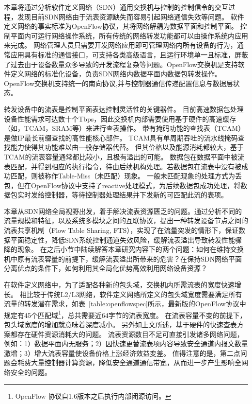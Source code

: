 
\label{chap5}


\label{chap51}

本章将通过分析软件定义网络（SDN）通用交换机与控制的控制信令的交互过程，发现目前SDN网络由于流表资源缺失而容易引起网络通信失效等问题。
软件定义网络的事实标准为OpenFlow协议，其将网络解耦为数据平面和控制平面。
控制平面内可运行网络操作系统，所有传统的网络转发功能都可以由操作系统内应用来完成。
网络管理人员只需要开发网络应用即可管理网络内所有设备的行为，通常应用具有标准的通信接口，可支持各类高级语言，且运行环境单一且标准，屏蔽了过去由于设备数量众多导致的开发流程复杂等问题。OpenFlow交换机是支持软件定义网络的标准化设备，负责SDN网络内数据平面内数据包转发操作。
OpenFlow交换机支持统一的南向协议,并与控制器通信传递配置信息与数据层状态。

转发设备中的流表是控制平面表达控制灵活性的关键器件。
目前高速数据包处理设备性能需求可达数十个Tbps，因此交换机内部需要使用基于硬件的高速缓存（如，TCAM，SRAM等）来进行查表操作。
带有掩码功能的查找表（TCAM）是做IP最长前缀查找的高性能核心部件。
TCAM具有单周期吞吐的流水线掩码查找能力使得其功能难以由一般存储器代替。
但其价格以及能源消耗都较大，基于TCAM的流表容量通常都比较小，且极有溢出的可能。
数据包在数据平面中被流表匹配，并得到相应的执行指令，待由后续机构处理。若数据包在流表中没有被成功匹配，则被称作Table-Miss（未匹配）现象。
一般未匹配现象的处理方式为丢包，但在OpenFlow协议中支持了reactive处理模式，为后续数据包成功处理，将数据包实时发给控制器，等待控制器处理结果并下发新的可匹配此流的表项。

本章从SDN网络全局视野出发，着手解决流表资源匮乏的问题。通过分析不同的流量规模和特征，以及系统多模块之间的互联协议，提出一种转发设备节点之间的流表共享机制（Flow Table Sharing, FTS），实现了在流量突发的情形下，保证数据平面稳定性，降低SDN系统控制通道失效风险，缓解流表溢出导致转发性能骤降的现象。
在之后小节中陆续解答本章研究内容下的两个问题：如何在维持交换机中原有流表容量的前提下，缓解流表溢出所带来的危害？在保持SDN网络平面分离优点的条件下，如何利用其全局化优势高效利用网络设备资源？




在软件定义网络中，为了适配各种新的包头域，交换机内所需流表的宽度快速增长。
相比较于传统L2/L3网络，软件定义网络所定义的包头域宽度需要满足所有流量的转发潜在需求，如表~\ref{table:openflowspec}所示，最新版的OpenFlow协议中规定有45个匹配域\footnote{OpenFlow 协议自1.6版本之后执行内部闭源访问。}，总共需要近64字节的流表宽度。
在流表容量不变的前提下，包头域宽度的增加就意味着深度减小。
另外如上文所述，基于硬件的快速查表方案都存在硬件资源消耗大的问题。
流表资源数目不足可直接引发诸多网络问题，例如：1）数据平面内无服务；2）因快速更替流表项内容导致安全通道内报文数量激增；3）增大流表容量使设备价格上涨经济效益变差。
值得注意的是，第二点问题会耗费大量控制器计算资源，降低安全通道通信带宽，从而进一步产生影响全网络安全的问题。

